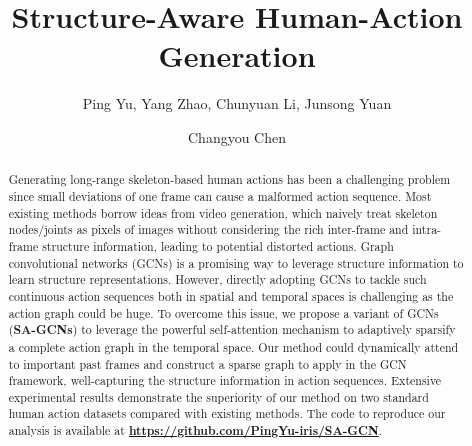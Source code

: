 \documentclass[runningheads]{llncs}
\begin{document}
\pagestyle{headings}
\mainmatter
\def\ECCVSubNumber{7020}  

\title{Structure-Aware Human-Action Generation} 

\begin{comment}
\titlerunning{ECCV-20 submission ID \ECCVSubNumber} 
\authorrunning{ECCV-20 submission ID \ECCVSubNumber} 
\author{Anonymous ECCV submission}
\institute{Paper ID \ECCVSubNumber}
\end{comment}


\author{Ping Yu, Yang Zhao, Chunyuan Li, Junsong Yuan  \and Changyou Chen }
\maketitle

\begin{abstract}
Generating long-range skeleton-based human actions has been a challenging problem since small deviations of one frame can cause a malformed action sequence. Most existing methods borrow ideas from video generation, which naively treat skeleton nodes/joints as pixels of images without considering the rich inter-frame and intra-frame structure information, leading to potential distorted actions. Graph convolutional networks (GCNs) is a promising way to leverage structure information to learn structure representations. However, directly adopting GCNs to tackle such continuous action sequences both in spatial and temporal spaces is challenging as the action graph could be huge. To overcome this issue, we propose a variant of GCNs (\textbf{SA-GCNs}) to leverage the powerful self-attention mechanism to adaptively sparsify a complete action graph in the temporal space. Our method could dynamically attend to important past frames and construct a sparse graph to apply in the GCN framework, well-capturing the structure information in action sequences. 
Extensive experimental results demonstrate the superiority of our method on two standard human action datasets compared with existing methods. The code to reproduce our analysis is available at
\textcolor{tblue}{{\bf \href{https://github.com/PingYu-iris/SA-GCN}{https://github.com/PingYu-iris/SA-GCN}}}.


\end{abstract}
\end{document}
